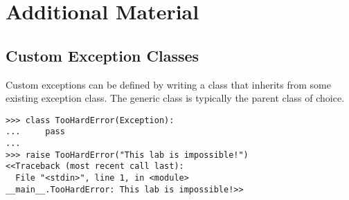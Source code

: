 \begin{problem}
\begin{comment}
Examples:

\begin{lstlisting}
# example.txt
a b c
d e f
\end{lstlisting}

\begin{lstlisting}
>>> cf = ContentFilter("example.txt")

>>> cf.uniform("uniform.txt", mode='w', case="upper")
>>> cf.uniform("uniform.txt", mode='a', case="lower")

>>> cf.reverse("reverse.txt", mode='w', unit="word")
>>> cf.reverse("reverse.txt", mode='a', unit="line")

>>> cf.transpose("transpose.txt", mode='w')
\end{lstlisting}

\begin{lstlisting}
# uniform.txt
A B C
D E F
a b c
d e f
\end{lstlisting}

\begin{lstlisting}
# reverse.txt
c b a
f e d
d e f
a b c
\end{lstlisting}

\begin{lstlisting}
a d
b e
c f
\end{lstlisting}
\end{comment}

\end{problem}

\newpage

\section*{Additional Material} %

\subsection*{Custom Exception Classes} %

Custom exceptions can be defined by writing a class that inherits from some existing exception class.
The generic  class is typically the parent class of choice.

\begin{lstlisting}
>>> class TooHardError(Exception):
...     pass
...
>>> raise TooHardError("This lab is impossible!")
<<Traceback (most recent call last):
  File "<stdin>", line 1, in <module>
__main__.TooHardError: This lab is impossible!>>
\end{lstlisting}


